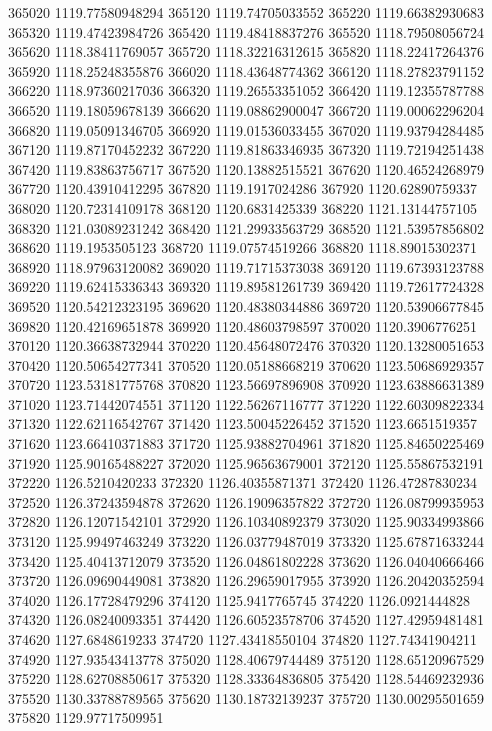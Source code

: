 {365020 1119.77580948294
365120 1119.74705033552
365220 1119.66382930683
365320 1119.47423984726
365420 1119.48418837276
365520 1118.79508056724
365620 1118.38411769057
365720 1118.32216312615
365820 1118.22417264376
365920 1118.25248355876
366020 1118.43648774362
366120 1118.27823791152
366220 1118.97360217036
366320 1119.26553351052
366420 1119.12355787788
366520 1119.18059678139
366620 1119.08862900047
366720 1119.00062296204
366820 1119.05091346705
366920 1119.01536033455
367020 1119.93794284485
367120 1119.87170452232
367220 1119.81863346935
367320 1119.72194251438
367420 1119.83863756717
367520 1120.13882515521
367620 1120.46524268979
367720 1120.43910412295
367820 1119.1917024286
367920 1120.62890759337
368020 1120.72314109178
368120 1120.6831425339
368220 1121.13144757105
368320 1121.03089231242
368420 1121.29933563729
368520 1121.53957856802
368620 1119.1953505123
368720 1119.07574519266
368820 1118.89015302371
368920 1118.97963120082
369020 1119.71715373038
369120 1119.67393123788
369220 1119.62415336343
369320 1119.89581261739
369420 1119.72617724328
369520 1120.54212323195
369620 1120.48380344886
369720 1120.53906677845
369820 1120.42169651878
369920 1120.48603798597
370020 1120.3906776251
370120 1120.36638732944
370220 1120.45648072476
370320 1120.13280051653
370420 1120.50654277341
370520 1120.05188668219
370620 1123.50686929357
370720 1123.53181775768
370820 1123.56697896908
370920 1123.63886631389
371020 1123.71442074551
371120 1122.56267116777
371220 1122.60309822334
371320 1122.62116542767
371420 1123.50045226452
371520 1123.6651519357
371620 1123.66410371883
371720 1125.93882704961
371820 1125.84650225469
371920 1125.90165488227
372020 1125.96563679001
372120 1125.55867532191
372220 1126.5210420233
372320 1126.40355871371
372420 1126.47287830234
372520 1126.37243594878
372620 1126.19096357822
372720 1126.08799935953
372820 1126.12071542101
372920 1126.10340892379
373020 1125.90334993866
373120 1125.99497463249
373220 1126.03779487019
373320 1125.67871633244
373420 1125.40413712079
373520 1126.04861802228
373620 1126.04040666466
373720 1126.09690449081
373820 1126.29659017955
373920 1126.20420352594
374020 1126.17728479296
374120 1125.9417765745
374220 1126.0921444828
374320 1126.08240093351
374420 1126.60523578706
374520 1127.42959481481
374620 1127.6848619233
374720 1127.43418550104
374820 1127.74341904211
374920 1127.93543413778
375020 1128.40679744489
375120 1128.65120967529
375220 1128.62708850617
375320 1128.33364836805
375420 1128.54469232936
375520 1130.33788789565
375620 1130.18732139237
375720 1130.00295501659
375820 1129.97717509951
}
